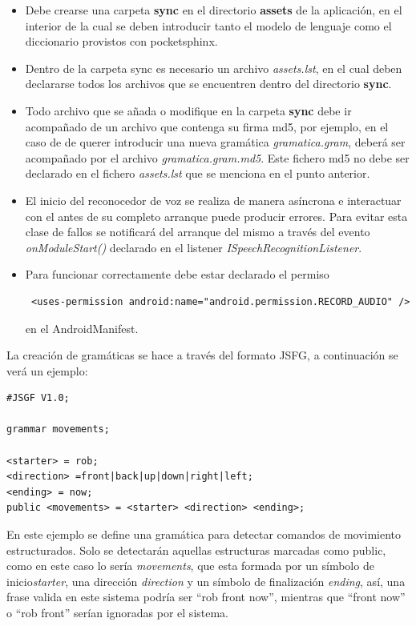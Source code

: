 \begin{itemize}
	\item Debe crearse una carpeta \textbf{sync} en el directorio \textbf{assets} de la aplicación, en el interior de la cual se deben introducir tanto el modelo de lenguaje como el diccionario provistos con pocketsphinx.
	\item Dentro de la carpeta sync es necesario un archivo \textit{assets.lst}, en el cual deben declararse todos los archivos que se encuentren dentro del directorio \textbf{sync}.
	\item Todo archivo que se añada o modifique en la carpeta \textbf{sync} debe ir acompañado de un archivo que contenga su firma md5, por ejemplo, en el caso de de querer introducir una nueva gramática \textit{gramatica.gram}, deberá ser acompañado por el archivo \textit{gramatica.gram.md5}. Este fichero md5 no debe ser declarado en el fichero \textit{assets.lst} que se menciona en el punto anterior.
	\item El inicio del reconocedor de voz se realiza de manera asíncrona e interactuar con el antes de su completo arranque puede producir errores. Para evitar esta clase de fallos se notificará del arranque del mismo a través del evento \textit{onModuleStart()} declarado en el listener \textit{ISpeechRecognitionListener}.
	\item Para funcionar correctamente debe estar declarado el permiso \begin{verbatim} <uses-permission android:name="android.permission.RECORD_AUDIO" /> \end{verbatim} en el AndroidManifest.
		
	
\end{itemize}

La creación de gramáticas se hace a través del formato JSFG, a continuación se verá un ejemplo:

\begin{verbatim}
#JSGF V1.0;

grammar movements;

<starter> = rob;
<direction> =front|back|up|down|right|left;
<ending> = now;
public <movements> = <starter> <direction> <ending>;
\end{verbatim}

En este ejemplo se define una gramática para detectar comandos de movimiento estructurados. Solo se detectarán aquellas estructuras marcadas como public, como en este caso lo sería \textit{movements}, que esta formada por un símbolo de inicio\textit{starter}, una dirección \textit{direction} y un símbolo de finalización \textit{ending}, así, una frase valida en este sistema podría ser \enquote{rob front now}, mientras que \enquote{front now} o \enquote{rob front} serían ignoradas por el sistema.

